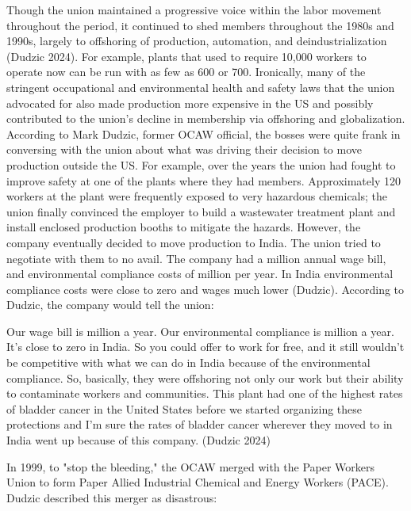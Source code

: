 \documentclass[12pt]{article}
\renewenvironment{quote}
  {\list{}{\leftmargin=\parindent\rightmargin=0pt}%
   \item\relax}
  {\endlist}
\begin{document}
Though the union maintained a progressive voice within the labor movement throughout the period, it continued to shed members throughout the 1980s and 1990s, largely to offshoring of production, automation, and deindustrialization (Dudzic 2024). For example, plants that used to require 10,000 workers to operate now can be run with as few as 600 or 700. Ironically, many of the stringent occupational and environmental health and safety laws that the union advocated for also made production more expensive in the US and possibly contributed to the union’s decline in membership via offshoring and globalization. According to Mark Dudzic, former OCAW official, the bosses were quite frank in conversing with the union about what was driving their decision to move production outside the US. For example, over the years the union had fought to improve safety at one of the plants where they had members. Approximately 120 workers at the plant were frequently exposed to very hazardous chemicals; the union finally convinced the employer to build a wastewater treatment plant and install enclosed production booths to mitigate the hazards. However, the company eventually decided to move production to India. The union tried to negotiate with them to no avail. The company had a   million annual wage bill, and environmental compliance costs of   million per year. In India environmental compliance costs were close to zero and wages much lower (Dudzic). According to Dudzic, the company would tell the union:

\begin{quote}
Our wage bill is  million a year. Our environmental compliance is  million a year. It's close to zero in India. So you could offer to work for free, and it still wouldn't be competitive with what we can do in India because of the environmental compliance. So, basically, they were offshoring not only our work but their ability to contaminate workers and communities. This plant had one of the highest rates of bladder cancer in the United States before we started organizing these protections and I'm sure the rates of bladder cancer wherever they moved to in India went up because of this company. (Dudzic 2024)
\end{quote}

In 1999, to "stop the bleeding," the OCAW merged with the Paper Workers Union to form Paper Allied Industrial Chemical and Energy Workers (PACE). Dudzic described this merger as disastrous:
\end{document}
